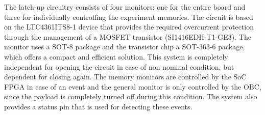 The latch-up circuitry consists of four monitors: one for the entire board and three for individually controlling the experiment memories. The circuit is based on the LTC4361ITS8-1 device that provides the required overcurrent protection through the management of a MOSFET transistor (SI1416EDH-T1-GE3). The monitor uses a SOT-8 package and the transistor chip a SOT-363-6 package, which offers a compact and efficient solution. This system is completely independent for opening the circuit in case of non nominal condition, but dependent for closing again. The memory monitors are controlled by the SoC FPGA in case of an event and the general monitor is only controlled by the OBC, since the payload is completely turned off during this condition. The system also provides a status pin that is used for detecting these events. 




\clearpage
